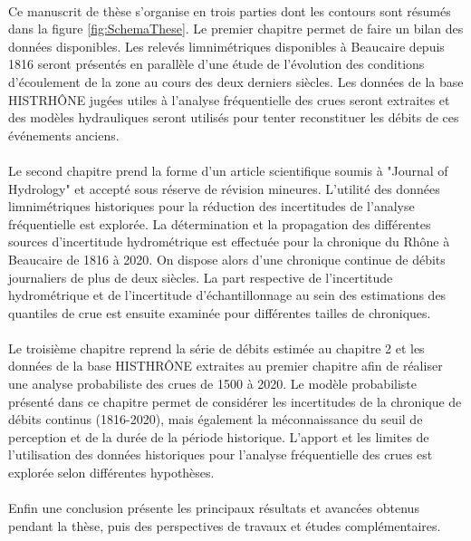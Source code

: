 	\paragraph{} Ce manuscrit de thèse s'organise en trois parties dont les contours sont résumés dans la figure \ref{fig:SchemaThese}. Le premier chapitre permet de faire un bilan des données disponibles. Les relevés limnimétriques disponibles à Beaucaire depuis 1816  seront présentés en parallèle d'une étude de l'évolution des conditions d'écoulement de la zone au cours des deux derniers siècles. Les données de la base HISTRHÔNE jugées utiles à l'analyse fréquentielle des crues seront extraites et des modèles hydrauliques seront utilisés pour tenter reconstituer les débits de ces événements anciens. 
	
	\paragraph{} Le second chapitre prend la forme d'un article scientifique soumis à "Journal of Hydrology" et accepté sous réserve de révision mineures. L'utilité des données limnimétriques historiques pour la réduction des incertitudes de l'analyse fréquentielle est explorée. La détermination et la propagation des différentes sources d'incertitude hydrométrique est effectuée pour la chronique du Rhône à Beaucaire de 1816 à 2020. On dispose alors d'une chronique continue de débits journaliers de plus de deux siècles. La part respective de l'incertitude hydrométrique et de l'incertitude d'échantillonnage au sein des estimations des quantiles de crue est ensuite examinée pour différentes tailles de chroniques. 
	
	\paragraph{} Le troisième chapitre reprend la série de débits estimée au chapitre 2 et les données de la base HISTHRÔNE extraites au premier chapitre afin de réaliser une analyse probabiliste des crues de 1500 à 2020. Le modèle probabiliste présenté dans ce chapitre permet de considérer les incertitudes de la chronique de débits continus (1816-2020), mais également la méconnaissance du seuil de perception et de la durée de la période historique. L'apport et les limites de l'utilisation des données historiques pour l'analyse fréquentielle des crues est explorée selon différentes hypothèses. 
	
	\paragraph{} Enfin une conclusion présente les principaux résultats et avancées obtenus pendant la thèse, puis des perspectives de travaux et études complémentaires.
	

